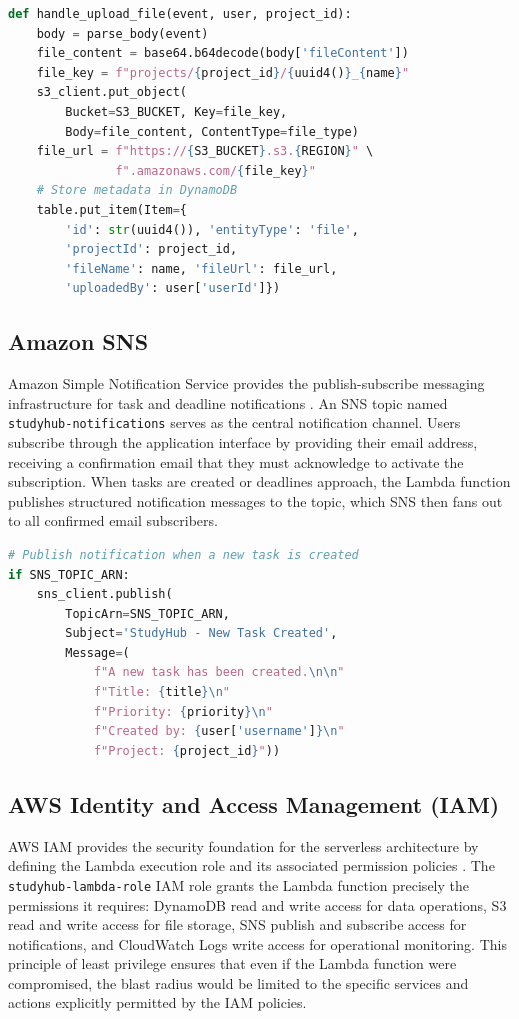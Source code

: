 \documentclass[conference]{IEEEtran}
\begin{document}
\begin{lstlisting}[language=Python, caption={S3 file upload within project context}]
def handle_upload_file(event, user, project_id):
    body = parse_body(event)
    file_content = base64.b64decode(body['fileContent'])
    file_key = f"projects/{project_id}/{uuid4()}_{name}"
    s3_client.put_object(
        Bucket=S3_BUCKET, Key=file_key,
        Body=file_content, ContentType=file_type)
    file_url = f"https://{S3_BUCKET}.s3.{REGION}" \
               f".amazonaws.com/{file_key}"
    # Store metadata in DynamoDB
    table.put_item(Item={
        'id': str(uuid4()), 'entityType': 'file',
        'projectId': project_id,
        'fileName': name, 'fileUrl': file_url,
        'uploadedBy': user['userId']})
\end{lstlisting}

\subsection{Amazon SNS}

Amazon Simple Notification Service provides the publish-subscribe messaging infrastructure for task and deadline notifications \cite{awssns}. An SNS topic named \texttt{studyhub-notifications} serves as the central notification channel. Users subscribe through the application interface by providing their email address, receiving a confirmation email that they must acknowledge to activate the subscription. When tasks are created or deadlines approach, the Lambda function publishes structured notification messages to the topic, which SNS then fans out to all confirmed email subscribers.

\begin{lstlisting}[language=Python, caption={SNS notification on task creation}]
# Publish notification when a new task is created
if SNS_TOPIC_ARN:
    sns_client.publish(
        TopicArn=SNS_TOPIC_ARN,
        Subject='StudyHub - New Task Created',
        Message=(
            f"A new task has been created.\n\n"
            f"Title: {title}\n"
            f"Priority: {priority}\n"
            f"Created by: {user['username']}\n"
            f"Project: {project_id}"))
\end{lstlisting}

\subsection{AWS Identity and Access Management (IAM)}

AWS IAM provides the security foundation for the serverless architecture by defining the Lambda execution role and its associated permission policies \cite{awsiam}. The \texttt{studyhub-lambda-role} IAM role grants the Lambda function precisely the permissions it requires: DynamoDB read and write access for data operations, S3 read and write access for file storage, SNS publish and subscribe access for notifications, and CloudWatch Logs write access for operational monitoring. This principle of least privilege ensures that even if the Lambda function were compromised, the blast radius would be limited to the specific services and actions explicitly permitted by the IAM policies.
\end{document}
